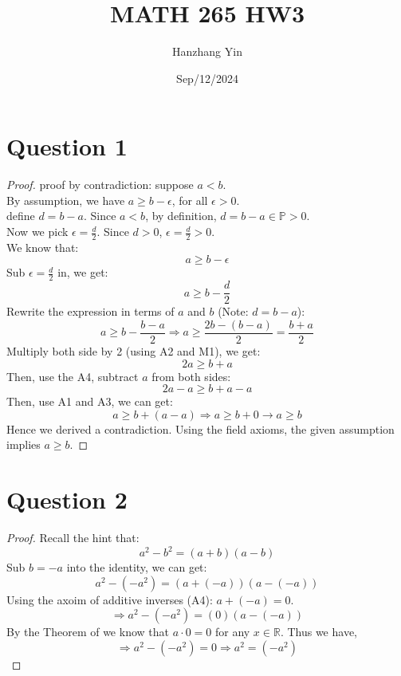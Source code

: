 \documentclass{article}
\title{MATH 265 HW3}
\author{Hanzhang Yin}
\date{Sep/12/2024}
\begin{document}
\maketitle

\section*{Question 1}
\begin{proof}
    proof by contradiction: suppose $a < b$.
    \\
    By assumption, we have $a \geq b - \epsilon$, for all $\epsilon > 0$.
    \\
    define $d = b - a$. Since $a < b$, by definition, $d = b - a \in \mathbb{P} > 0$.
    \\
    Now we pick $\epsilon = \frac{d}{2}$. Since $d > 0$, $\epsilon = \frac{d}{2} > 0$.
    \\
    We know that:
    \[ a \geq b - \epsilon \]
    Sub $\epsilon = \frac{d}{2}$ in, we get:
    \[ a \geq b - \frac{d}{2} \]
    Rewrite the expression in terms of $a$ and $b$ (Note: $d = b - a$):
    \[ a \geq b - \frac{b - a}{2} \Rightarrow a \geq \frac{2b - (b - a)}{2} = \frac{b + a}{2} \]
    Multiply both side by 2 (using A2 and M1), we get:
    \[ 2a \geq b + a \]
    Then, use the A4, subtract $a$ from both sides:
    \[ 2a - a \geq b + a - a \]
    Then, use A1 and A3, we can get:
    \[ a \geq b + (a - a) \Rightarrow a \geq b + 0 \rightarrow a \geq b \]
    Hence we derived a contradiction. Using the field axioms, the given assumption implies $a \geq b$.
\end{proof}

\newpage

\section*{Question 2}
\begin{proof}
    Recall the hint that:
    \[ a^2 - b^2 = (a + b)(a - b) \]
    Sub $b = -a$ into the identity, we can get:
    \[ a^2 - (-a^2) = (a + (-a))(a - (-a)) \]
    Using the axoim of additive inverses (A4): $a + (-a) = 0$.
    \[ \Rightarrow a^2 - (-a^2) = (0)(a - (-a)) \]
    By the Theorem of we know that $a \cdot 0 = 0$ for any $x \in \mathbb{R}$. Thus we have,
    \[ \Rightarrow a^2 - (-a^2) = 0 \Rightarrow a^2  = (-a^2) \]
\end{proof}

\newpage
\end{document}
